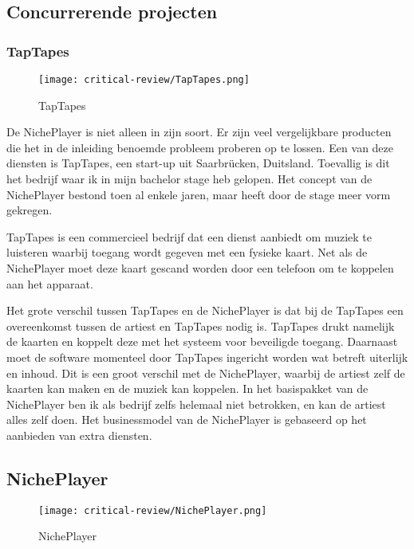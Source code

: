 \subsection{Concurrerende projecten}
\subsubsection*{TapTapes}
\begin{wrapfigure}{r}{0.25\textwidth}
    \centering
    \texttt{[image: critical-review/TapTapes.png]}
    \caption{TapTapes}
    \label{fig:critical-review:TapTapes}
\end{wrapfigure}
De NichePlayer is niet alleen in zijn soort. Er zijn veel vergelijkbare producten die het in de inleiding benoemde probleem proberen op te lossen. Een van deze diensten is TapTapes, een start-up uit Saarbrücken, Duitsland. Toevallig is dit het bedrijf waar ik in mijn bachelor stage heb gelopen. Het concept van de NichePlayer bestond toen al enkele jaren, maar heeft door de stage meer vorm gekregen.

TapTapes is een commercieel bedrijf dat een dienst aanbiedt om muziek te luisteren waarbij toegang wordt gegeven met een fysieke kaart. Net als de NichePlayer moet deze kaart gescand worden door een telefoon om te koppelen aan het apparaat.

Het grote verschil tussen TapTapes en de NichePlayer is dat bij de TapTapes een overeenkomst tussen de artiest en TapTapes nodig is. TapTapes drukt namelijk de kaarten  en koppelt deze met het systeem voor beveiligde toegang. Daarnaast moet de software momenteel door TapTapes ingericht worden wat betreft uiterlijk en inhoud. Dit is een groot verschil met de NichePlayer, waarbij de artiest zelf de kaarten kan maken en de muziek kan koppelen. In het basispakket van de NichePlayer ben ik als bedrijf zelfs helemaal niet betrokken, en kan de artiest alles zelf doen. Het businessmodel van de NichePlayer is gebaseerd op het aanbieden van extra diensten.


\subsection{NichePlayer}
\begin{wrapfigure}{r}{0.25\textwidth}
    \centering
    \texttt{[image: critical-review/NichePlayer.png]}
    \caption{NichePlayer}
    \label{fig:critical-review:NichePlayer}
\end{wrapfigure}


